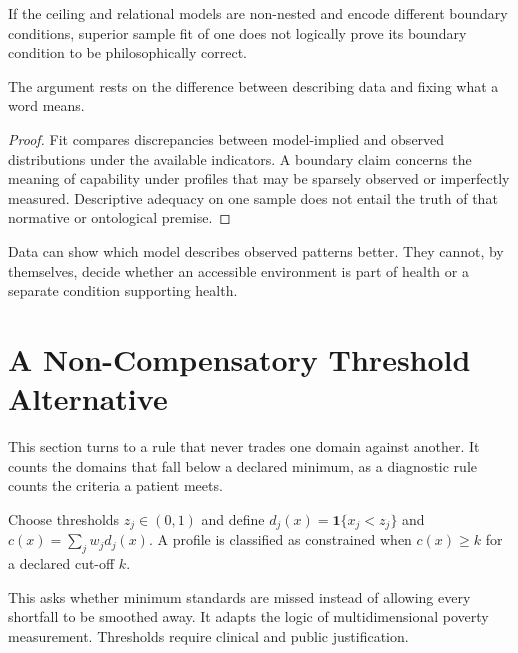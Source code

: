\begin{proposition}
If the ceiling and relational models are non-nested and encode different
boundary conditions, superior sample fit of one does not logically prove its
boundary condition to be philosophically correct.
\end{proposition}
The argument rests on the difference between describing data and fixing what
a word means.
\begin{proof}
Fit compares discrepancies between model-implied and observed distributions
under the available indicators. A boundary claim concerns the meaning of
capability under profiles that may be sparsely observed or imperfectly
measured. Descriptive adequacy on one sample does not entail the truth of that
normative or ontological premise.
\end{proof}

\begin{remark}
Data can show which model describes observed patterns better. They cannot, by
themselves, decide whether an accessible environment is part of health or a
separate condition supporting health.
\end{remark}

\section{A Non-Compensatory Threshold Alternative}
\label{app:a-threshold}

This section turns to a rule that never trades one domain against another. It
counts the domains that fall below a declared minimum, as a diagnostic rule
counts the criteria a patient meets.

\begin{definition}
Choose thresholds $z_j\in(0,1)$ and define
$d_j(x)=\mathbf1\{x_j<z_j\}$ and $c(x)=\sum_jw_jd_j(x)$. A profile is
classified as constrained when $c(x)\ge k$ for a declared cut-off $k$.
\end{definition}

\begin{remark}
This asks whether minimum standards are missed instead of allowing every
shortfall to be smoothed away. It adapts the logic of multidimensional poverty
measurement. \citep{alkire_foster_2011} Thresholds require clinical and public
justification.
\end{remark}

